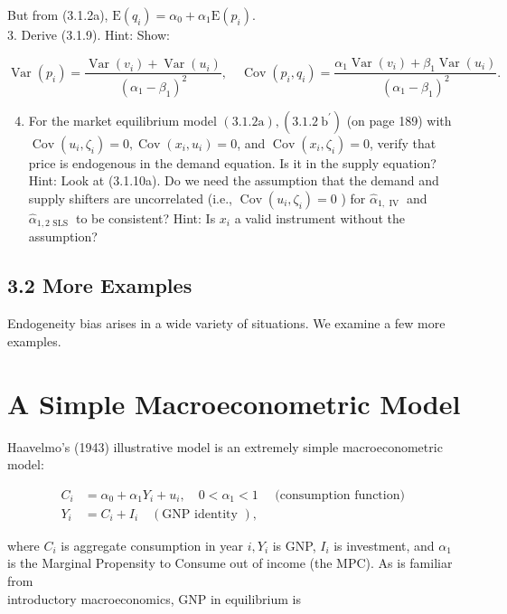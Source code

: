 \documentclass[10pt]{article}
\begin{document}
But from (3.1.2a), $\mathrm{E}\left(q_{i}\right)=\alpha_{0}+\alpha_{1} \mathrm{E}\left(p_{i}\right)$.\\
3. Derive (3.1.9). Hint: Show:

$$
\operatorname{Var}\left(p_{i}\right)=\frac{\operatorname{Var}\left(v_{i}\right)+\operatorname{Var}\left(u_{i}\right)}{\left(\alpha_{1}-\beta_{1}\right)^{2}}, \quad \operatorname{Cov}\left(p_{i}, q_{i}\right)=\frac{\alpha_{1} \operatorname{Var}\left(v_{i}\right)+\beta_{1} \operatorname{Var}\left(u_{i}\right)}{\left(\alpha_{1}-\beta_{1}\right)^{2}} .
$$

\begin{enumerate}
  \setcounter{enumi}{3}
  \item For the market equilibrium model $(3.1 .2 \mathrm{a}),\left(3.1 .2 \mathrm{~b}^{\prime}\right)$ (on page 189) with $\operatorname{Cov}\left(u_{i}, \zeta_{i}\right)=0, \operatorname{Cov}\left(x_{i}, u_{i}\right)=0$, and $\operatorname{Cov}\left(x_{i}, \zeta_{i}\right)=0$, verify that price is endogenous in the demand equation. Is it in the supply equation? Hint: Look at (3.1.10a). Do we need the assumption that the demand and supply shifters are uncorrelated (i.e., $\operatorname{Cov}\left(u_{i}, \zeta_{i}\right)=0$ ) for $\hat{\alpha}_{1, \text { IV }}$ and $\hat{\alpha}_{1,2 \text { SLS }}$ to be consistent? Hint: Is $x_{i}$ a valid instrument without the assumption?
\end{enumerate}

\subsection*{3.2 More Examples}
Endogeneity bias arises in a wide variety of situations. We examine a few more examples.

\section*{A Simple Macroeconometric Model}
Haavelmo's (1943) illustrative model is an extremely simple macroeconometric model:

$$
\begin{aligned}
C_{i} & =\alpha_{0}+\alpha_{1} Y_{i}+u_{i}, \quad 0<\alpha_{1}<1 \quad \text { (consumption function) } \\
Y_{i} & =C_{i}+I_{i} \quad(\mathrm{GNP} \text { identity }),
\end{aligned}
$$

where $C_{i}$ is aggregate consumption in year $i, Y_{i}$ is GNP, $I_{i}$ is investment, and $\alpha_{1}$ is the Marginal Propensity to Consume out of income (the MPC). As is familiar from\\
introductory macroeconomics, GNP in equilibrium is
\end{document}
